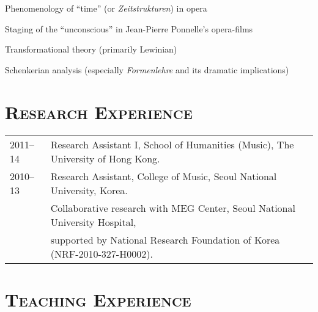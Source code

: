 \documentclass[letter,11pt,draft]{article}
\begin{document}
  \hspace{2mm} \textbullet \hspace{2mm} Phenomenology of ``time'' (or \textit{Zeitstrukturen}) in opera
  
  
  \noindent \hspace{2mm} \textbullet \hspace{2mm} Staging of the ``unconscious'' in Jean-Pierre Ponnelle's opera-films
  
  \noindent \hspace{2mm} \textbullet \hspace{2mm} Transformational theory (primarily Lewinian)
  
  \noindent \hspace{2mm} \textbullet \hspace{2mm} Schenkerian analysis (especially \textit{Formenlehre} and its dramatic implications)
  
  \section*{\textsc{Research Experience}}
  
  \hspace*{-0.25cm}
  \begin{tabular}{p{2.5cm} l}
    2011--14 & Research Assistant I, School of Humanities (Music), The University of Hong Kong.\\[2mm]
    
    2010--13 & Research Assistant, College of Music, Seoul National University, Korea.\\
    & Collaborative research with MEG Center, Seoul National University Hospital,\\
    & supported by National Research Foundation of Korea (NRF-2010-327-H0002).
  \end{tabular}
  
  \section*{\textsc{Teaching Experience}}
  
\end{document}
